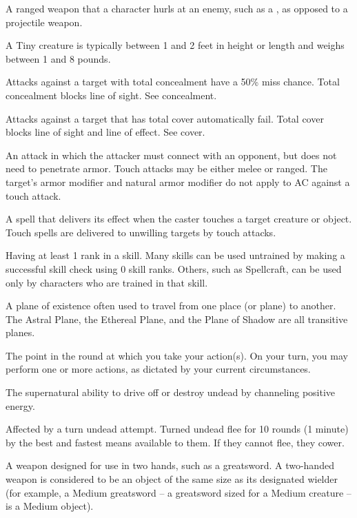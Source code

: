  A ranged weapon that a character hurls at an 
enemy, such as a , as opposed to a projectile weapon. 

 A Tiny creature is typically between 1 and 2 feet in height 
or length and weighs between 1 and 8 pounds. 

 Attacks against a target with total concealment have a 50\% miss chance. Total concealment blocks line of sight. See concealment. 

 Attacks against a target that has total cover automatically fail. Total cover blocks line of sight and line of effect. See cover. 

 An attack in which the attacker must connect with 
an opponent, but does not need to penetrate armor. Touch attacks 
may be either melee or ranged. The target's armor modifier and natural armor modifier do not apply to AC against a touch attack. 

 A spell that delivers its effect when the caster 
touches a target creature or object. Touch spells are delivered to 
unwilling targets by touch attacks. 

 Having at least 1 rank in a skill. Many skills can be used 
untrained by making a successful skill check using 0 skill ranks. 
Others, such as Spellcraft, can be used only by characters who are 
trained in that skill. 

 A plane of existence often used to travel from 
one place (or plane) to another. The Astral Plane, the Ethereal Plane, 
and the Plane of Shadow are all transitive planes. 

 The point in the round at which you take your action(s). On 
your turn, you may perform one or more actions, as dictated by your 
current circumstances. 

 The supernatural ability to drive off or destroy 
undead by channeling positive energy. 

 Affected by a turn undead attempt. Turned undead flee 
for 10 rounds (1 minute) by the best and fastest means available to 
them. If they cannot flee, they cower. 

 A weapon designed for use in two hands, 
such as a greatsword. A two-handed weapon is considered to be an 
object of the same size as its designated wielder (for example, a 
Medium greatsword -- a greatsword sized for a Medium creature -- is a Medium object). 

